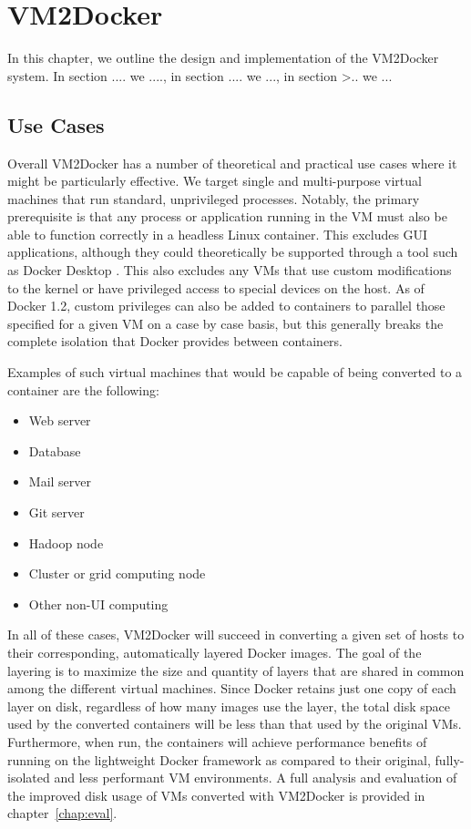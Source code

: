 \chapter{VM2Docker}
In this chapter, we outline the design and implementation of the VM2Docker system. In section .... we ...., in section .... we ..., in section >.. we ...

\section{Use Cases}
Overall VM2Docker has a number of theoretical and practical use cases where it might be particularly effective. We target single and multi-purpose virtual machines that run standard, unprivileged processes. Notably, the primary prerequisite is that any process or application running in the VM must also be able to function correctly in a headless Linux container. This excludes GUI applications, although they could theoretically be supported through a tool such as Docker Desktop \cite{ddesktop}. This also excludes any VMs that use custom modifications to the kernel or have privileged access to special devices on the host. As of Docker 1.2, custom privileges can also be added to containers to parallel those specified for a given VM on a case by case basis, but this generally breaks the complete isolation that Docker provides between containers.

Examples of such virtual machines that would be capable of being converted to a container are the following:
\begin{itemize}
\item Web server
\item Database
\item Mail server
\item Git server
\item Hadoop node
\item Cluster or grid computing node
\item Other non-UI computing
\end{itemize}

In all of these cases, VM2Docker will succeed in converting a given set of hosts to their corresponding, automatically layered Docker images. The goal of the layering is to maximize the size and quantity of layers that are shared in common among the different virtual machines. Since Docker retains just one copy of each layer on disk, regardless of how many images use the layer, the total disk space used by the converted containers will be less than that used by the original VMs. Furthermore, when run, the containers will achieve performance benefits of running on the lightweight Docker framework as compared to their original, fully-isolated and less performant VM environments. A full analysis and evaluation of the improved disk usage of VMs converted with VM2Docker is provided in chapter~\ref{chap:eval}.

